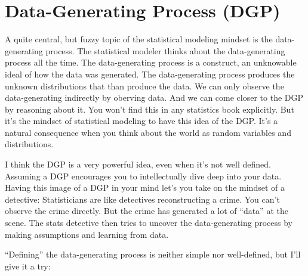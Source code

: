 \documentclass[
  10pt,
]{scrbook}
\begin{document}
\hypertarget{data-generating-process-dgp}{%
\section{Data-Generating Process (DGP)}\label{data-generating-process-dgp}}

A quite central, but fuzzy topic of the statistical modeling mindset is the data-generating process.
The statistical modeler thinks about the data-generating process all the time.
The data-generating process is a construct, an unknowable ideal of how the data was generated.
The data-generating process produces the unknown distributions that than produce the data.
We can only observe the data-generating indirectly by oberving data.
And we can come closer to the DGP by reasoning about it.
You won't find this in any statistics book explicitly.
But it's the mindset of statistical modeling to have this idea of the DGP.
It's a natural consequence when you think about the world as random variables and distributions.

I think the DGP is a very powerful idea, even when it's not well defined.
Assuming a DGP encourages you to intellectually dive deep into your data.
Having this image of a DGP in your mind let's you take on the mindset of a detective:
Statisticians are like detectives reconstructing a crime.
You can't observe the crime directly.
But the crime has generated a lot of ``data'' at the scene.
The stats detective then tries to uncover the data-generating process by making assumptions and learning from data.

``Defining'' the data-generating process is neither simple nor well-defined, but I'll give it a try:
\end{document}
